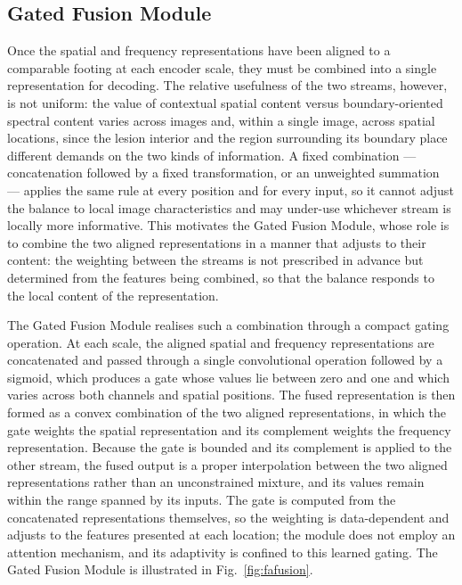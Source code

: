 \subsection{Gated Fusion Module}

Once the spatial and frequency representations have been aligned to a comparable footing at each encoder scale, they must be combined into a single representation for decoding. The relative usefulness of the two streams, however, is not uniform: the value of contextual spatial content versus boundary-oriented spectral content varies across images and, within a single image, across spatial locations, since the lesion interior and the region surrounding its boundary place different demands on the two kinds of information. A fixed combination --- concatenation followed by a fixed transformation, or an unweighted summation --- applies the same rule at every position and for every input, so it cannot adjust the balance to local image characteristics and may under-use whichever stream is locally more informative. This motivates the Gated Fusion Module, whose role is to combine the two aligned representations in a manner that adjusts to their content: the weighting between the streams is not prescribed in advance but determined from the features being combined, so that the balance responds to the local content of the representation.

The Gated Fusion Module realises such a combination through a compact gating operation. At each scale, the aligned spatial and frequency representations are concatenated and passed through a single convolutional operation followed by a sigmoid, which produces a gate whose values lie between zero and one and which varies across both channels and spatial positions. The fused representation is then formed as a convex combination of the two aligned representations, in which the gate weights the spatial representation and its complement weights the frequency representation. Because the gate is bounded and its complement is applied to the other stream, the fused output is a proper interpolation between the two aligned representations rather than an unconstrained mixture, and its values remain within the range spanned by its inputs. The gate is computed from the concatenated representations themselves, so the weighting is data-dependent and adjusts to the features presented at each location; the module does not employ an attention mechanism, and its adaptivity is confined to this learned gating. The Gated Fusion Module is illustrated in Fig.~\ref{fig:fafusion}.

